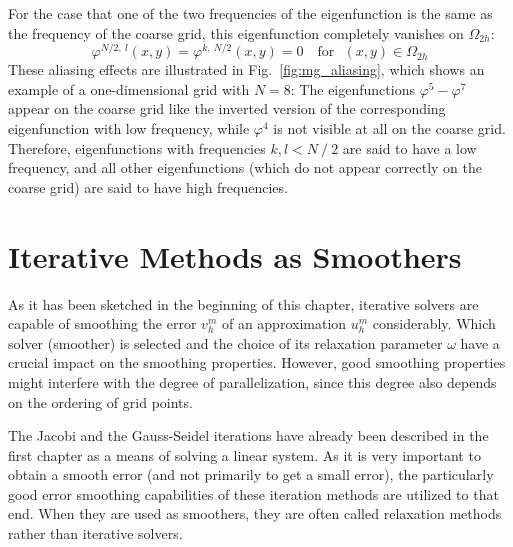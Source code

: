 For the case that one of the two frequencies of the eigenfunction is the same as the frequency of the coarse grid, this eigenfunction completely vanishes on $\Omega_{2h}$:
\begin{equation}
\varphi^{N/2,~l}(x,y) = \varphi^{k,~N/2}(x,y) = 0  \text{~~~for~~}  (x,y) \in \Omega_{2h} 
\end{equation}
These aliasing effects are illustrated in Fig.~\ref{fig:mg_aliasing}, which shows an example of a one-dimensional grid with $N = 8$:  The eigenfunctions $\varphi^5-\varphi^7$ appear on the coarse grid like the inverted version of the corresponding eigenfunction with low frequency, while $\varphi^4$ is not visible at all on the coarse grid.
Therefore, eigenfunctions with frequencies $k, l < N~/~2$ are said to have a low frequency, and all other eigenfunctions (which do not appear correctly on the coarse grid) are said to have high frequencies.





\section{Iterative Methods as Smoothers}
As it has been sketched in the beginning of this chapter, iterative solvers are capable of smoothing the error $v_h^m$ of an approximation $u_h^m$ considerably. Which solver (smoother) is selected and the choice of its relaxation parameter $\omega$ have a crucial impact on the smoothing properties. However, good smoothing properties might interfere with the degree of parallelization, since this degree also depends on the ordering of grid points.

The Jacobi and the Gauss-Seidel iterations have already been described in the first chapter as a means of solving a linear system. As it is very important to obtain a smooth error (and not primarily to get a small error), the particularly good error smoothing capabilities of these iteration methods are utilized to that end. When they are used as smoothers, they are often called relaxation methods rather than iterative solvers. 


